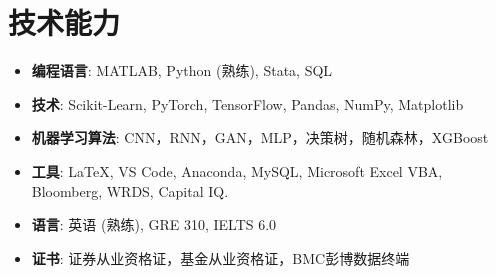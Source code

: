 \documentclass{resume}
\begin{document}
\section{技术能力}
\begin{itemize}[parsep=0.2ex]
  \item \textbf{编程语言}: MATLAB, Python (熟练), Stata, SQL
  \item \textbf{技术}: Scikit-Learn, PyTorch, TensorFlow, Pandas, NumPy, Matplotlib
  \item \textbf{机器学习算法}: CNN，RNN，GAN，MLP，决策树，随机森林，XGBoost
  \item \textbf{工具}{: \LaTeX{}, VS Code, Anaconda, MySQL, Microsoft Excel VBA, Bloomberg, WRDS, Capital IQ.} 
  \item\textbf{语言}{: 英语 (熟练), GRE 310, IELTS 6.0}
  \item\textbf{证书}{: 证券从业资格证，基金从业资格证，BMC彭博数据终端} \\
\end{itemize}
\end{document}
